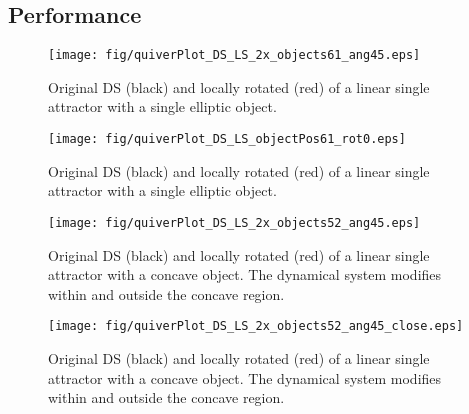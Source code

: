 \subsection{Performance}
\begin{figure} [H]
\centering
\texttt{[image: fig/quiverPlot\_DS\_LS\_2x\_objects61\_ang45.eps]}
\caption{Original DS (black) and locally rotated (red) of a linear single attractor with a single elliptic object. }
\label{fig:obj61}
\end{figure}

\begin{figure} [H]
\centering
\texttt{[image: fig/quiverPlot\_DS\_LS\_objectPos61\_rot0.eps]}
\caption{Original DS (black) and locally rotated (red) of a linear single attractor with a single elliptic object. }
\label{fig:obj61}
\end{figure}

\begin{figure} [H]
\centering
\texttt{[image: fig/quiverPlot\_DS\_LS\_2x\_objects52\_ang45.eps]}
\caption{Original DS (black) and locally rotated (red) of a linear single attractor with a concave object. The dynamical system modifies within and outside the concave region. }
\label{fig:obj61}
\end{figure}

\begin{figure} [H]
\centering
\texttt{[image: fig/quiverPlot\_DS\_LS\_2x\_objects52\_ang45\_close.eps]}
\caption{Original DS (black) and locally rotated (red) of a linear single attractor with a concave object. The dynamical system modifies within and outside the concave region.} 
\label{fig:obj61} 
\end{figure}

